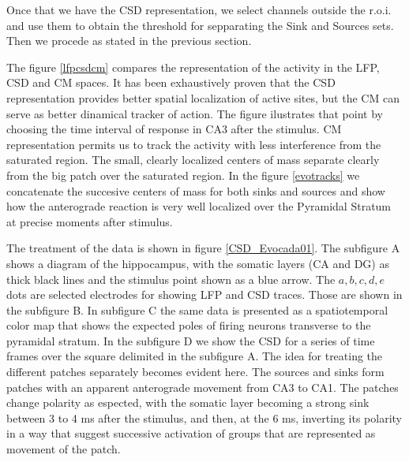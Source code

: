 \documentclass[12pt]{article}
\begin{document}
Once that we have the CSD representation, we select channels outside
the r.o.i. and use them to obtain the threshold for sepparating
the Sink and Sources sets. Then we procede as stated in the previous section.

The figure \ref{lfpcsdcm}  compares the representation of the activity in
the LFP, CSD and CM spaces. It has been exhaustively proven that the CSD
representation provides better spatial localization of active sites, but the
CM can serve as better dinamical tracker of action. The figure ilustrates
that point by choosing the time interval of response in CA3 after the stimulus.
CM representation permits us to track the activity with less
interference from the saturated region. The small, clearly localized centers of
mass separate clearly from the big patch over the saturated region.
In the figure \ref{evotracks} we concatenate the succesive centers of mass
for both sinks and sources and show how the anterograde reaction is
very well localized over the Pyramidal Stratum at precise moments after
stimulus.

The treatment of the data is shown in figure
\ref{CSD_Evocada01}.  The subfigure A  shows a diagram of the hippocampus, with
the somatic layers (CA and DG) as thick black lines and the stimulus point
shown as a blue arrow. The $a,b,c,d,e$ dots are selected electrodes for
showing LFP and CSD traces. Those are shown in the subfigure B. In subfigure
C the same data is presented as a spatiotemporal color map that
shows the expected poles of firing neurons transverse to the
pyramidal stratum.  In the subfigure D we show the CSD for a series of time frames
over the square delimited in the subfigure A. The idea for treating the different
patches separately becomes evident here. The sources and sinks form patches
with an apparent anterograde movement from CA3 to CA1.
The patches change polarity
as espected, with the somatic layer becoming a strong sink between 3 to 4 ms
after the stimulus, and then, at the 6 ms, inverting its polarity in a way that suggest
successive activation of groups that are represented as movement of the patch.
\end{document}
